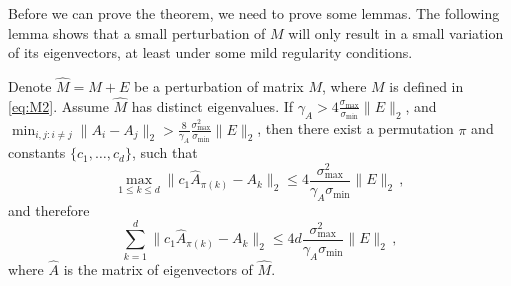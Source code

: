 Before we can prove the theorem, we need to prove some lemmas.
The following lemma shows that a small perturbation of $M$ will only result in a small variation of its eigenvectors, at least under some mild regularity conditions.
\begin{lemma}
\label{lem:eigenvectorvariation}
Denote $\hat{M} = M+E$ be a perturbation of matrix $M$, where $M$ is defined in  \eqref{eq:M2}. 
Assume $\hat{M}$ has distinct eigenvalues. 
If $\gamma_A > 4 \frac{\sigma_{\max}}{\sigma_{\min}}\|E\|_2$, and $\min_{i,j:i\neq j} \|A_i - A_j\|_2 > \frac{8}{\gamma_A}\frac{\sigma_{\max}^2}{\sigma_{\min} } \|E\|_2$, then there exist a permutation $\pi$ and constants $\{c_1,\ldots,c_d\}$, such that 
\[
\max_{1\le k\le d} \| c_1\hat{A}_{\pi(k)} - A_k\|_2 \le 4  \frac{\sigma_{\max}^2}{\gamma_A \sigma_{\min} } \|E\|_2\,,
\]
and therefore
\[
\sum_{k=1}^{d}\| c_1\hat{A}_{\pi(k)} - A_k\|_2 \le 4d  \frac{\sigma_{\max}^2}{\gamma_A \sigma_{\min}} \|E\|_2\,,
\]
where $\hat{A}$ is the matrix of eigenvectors of $\hat{M}$. 
\end{lemma}
